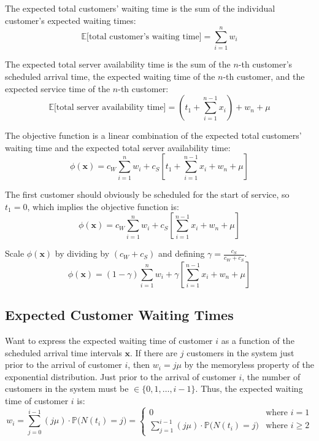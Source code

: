 The expected total customers' waiting time is the sum of the individual customer's expected waiting times:
\begin{equation}
	\mathbb{E} \Big[\text{total customer's waiting time} \Big] = \sum_{i = 1}^{n} w_{i}
\end{equation}

The expected total server availability time is the sum of the $n$-th customer's scheduled arrival time, the expected waiting time of the $n$-th customer, and the expected service time of the $n$-th customer:
\begin{equation}
	\mathbb{E} \Big[\text{total server availability time} \Big] = \left( t_{1} + \sum_{i = 1}^{n - 1} x_{i} \right) + w_{n} + \mu
\end{equation}

The objective function is a linear combination of the expected total customers' waiting time and the expected total server availability time:
\begin{equation}
	\phi (\mathbf{x}) = c_{W} \sum_{i = 1}^{n} w_{i} + c_{S} \left[ t_{1} + \sum_{i = 1}^{n - 1} x_{i} + w_{n} + \mu \right]
\end{equation}

The first customer should obviously be scheduled for the start of service, so $t_{1} = 0$, which implies the objective function is:
\begin{equation}
	\phi (\mathbf{x}) = c_{W} \sum_{i = 1}^{n} w_{i} + c_{S} \left[ \sum_{i = 1}^{n - 1} x_{i} + w_{n} + \mu \right]
\end{equation}

Scale $\phi (\mathbf{x})$ by dividing by $(c_{W} + c_{S})$ and defining $\gamma = \frac{c_{S}}{c_{W} + c_{S}}$.
\begin{equation}
	\phi (\mathbf{x}) = (1 - \gamma) \sum_{i = 1}^{n} w_{i} + \gamma \left[ \sum_{i = 1}^{n - 1} x_{i} + w_{n} + \mu \right]
	\label{eqn:StaticObjective}
\end{equation}

\subsection{Expected Customer Waiting Times}

Want to express the expected waiting time of customer $i$ as a function of the scheduled arrival time intervals $\mathbf{x}$. If there are $j$ customers in the system just prior to the arrival of customer $i$, then $w_{i} = j \mu$ by the memoryless property of the exponential distribution. Just prior to the arrival of customer $i$, the number of customers in the system must be $\in \{ 0, 1, \ldots, i - 1 \}$. Thus, the expected waiting time of customer $i$ is:
\begin{equation}
	w_{i} = \sum_{j = 0}^{i - 1} (j \mu) \cdot \mathbb{P} \Big( N (t_{i}) = j \Big) = \begin{cases} 0 & \text{where $i = 1$} \\ \sum_{j = 1}^{i - 1} (j \mu) \cdot \mathbb{P} \Big( N (t_{i}) = j \Big) & \text{where $i \geq 2$} \end{cases}
	\label{eqn:StaticWaiting}
\end{equation}

